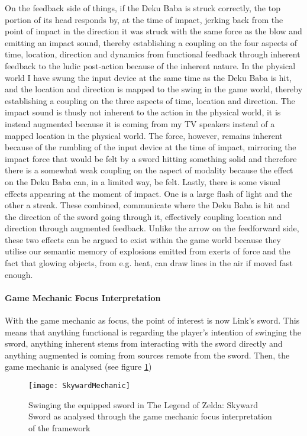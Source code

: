 On the feedback side of things, if the Deku Baba is struck correctly, the top portion of its head responds by, at the time of impact, jerking back from the point of impact in the direction it was struck with the same force as the blow and emitting an impact sound, thereby establishing a coupling on the four aspects of time, location, direction and dynamics from functional feedback through inherent feedback to the ludic post-action because of the inherent nature. In the physical world I have swung the input device at the same time as the Deku Baba is hit, and the location and direction is mapped to the swing in the game world, thereby establishing a coupling on the three aspects of time, location and direction. The impact sound is thusly not inherent to the action in the physical world, it is instead augmented because it is coming from my TV speakers instead of a mapped location in the physical world. The force, however, remains inherent because of the rumbling of the input device at the time of impact, mirroring the impact force that would be felt by a sword hitting something solid and therefore there is a somewhat weak coupling on the aspect of modality because the effect on the Deku Baba can, in a limited way, be felt. Lastly, there is some visual effects appearing at the moment of impact. One is a large flash of light and the other a streak. These combined, communicate where the Deku Baba is hit and the direction of the sword going through it, effectively coupling location and direction through augmented feedback. Unlike the arrow on the feedforward side, these two effects can be argued to exist within the game world because they utilise our semantic memory of explosions emitted from exerts of force and the fact that glowing objects, from e.g. heat, can draw lines in the air if moved fast enough.

\paragraph{Game Mechanic Focus Interpretation}
With the game mechanic as focus, the point of interest is now Link's sword. This means that anything functional is regarding the player's intention of swinging the sword, anything inherent stems from interacting with the sword directly and anything augmented is coming from sources remote from the sword. Then, the game mechanic is analysed (see figure \ref{SkywardMechanic})

\begin{figure}[hb]
  \texttt{[image: SkywardMechanic]}
  \caption{Swinging the equipped sword in The Legend of Zelda: Skyward Sword as analysed through the game mechanic focus interpretation of the framework}
  \label{SkywardMechanic}
\end{figure}

